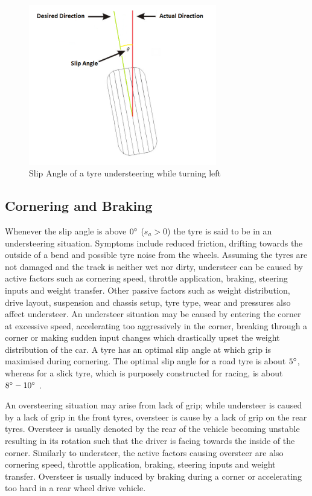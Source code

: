 \begin{figure}[!htb]
	\centering
	\includegraphics[height=7cm]{images/slipangle}
	\caption{Slip Angle of a tyre understeering while turning left}
	\label{fig:slipangle}
\end{figure}

\subsection{Cornering and Braking}
Whenever the slip angle is above $0\degree$ ($s_a > 0$) the tyre is said to be in an understeering situation. Symptoms include reduced friction, drifting towards the outside of a bend and possible tyre noise from the wheels. Assuming the tyres are not damaged and the track is neither wet nor dirty, understeer can be caused by active factors such as cornering speed, throttle application, braking, steering inputs and weight transfer. Other passive factors such as weight distribution, drive layout, suspension and chassis setup, tyre type, wear and pressures also affect understeer. An understeer situation may be caused by entering the corner at excessive speed, accelerating too aggressively in the corner, breaking through a corner or making sudden input changes which drastically upset the weight distribution of the car. A tyre has an optimal slip angle at which grip is maximised during cornering. The optimal slip angle for a road tyre is about $5\degree$, whereas for a slick tyre, which is purposely constructed for racing, is about $8\degree-10\degree$ \cite{beckman1991physics}.

An oversteering situation may arise from lack of grip; while understeer is caused by a lack of grip in the front tyres, oversteer is cause by a lack of grip on the rear tyres. Oversteer is usually denoted by the rear of the vehicle becoming unstable resulting in its rotation such that the driver is facing towards the inside of the corner. Similarly to understeer, the active factors causing oversteer are also cornering speed, throttle application, braking, steering inputs and weight transfer. Oversteer is usually induced by braking during a corner or accelerating too hard in a rear wheel drive vehicle.

